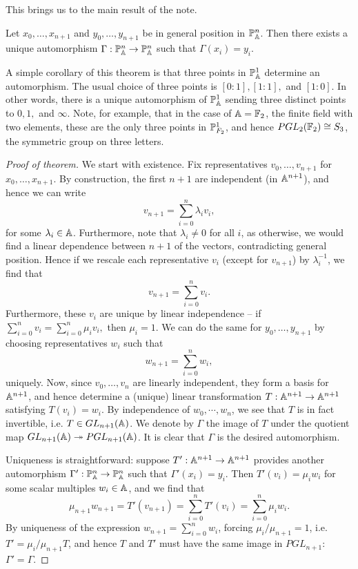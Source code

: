 \documentclass{../../mathnotes}
\begin{document}
This brings us to the main result of the note.

\begin{thm}
    Let $x_0,\ldots, x_{n+1}$ and $y_0,\ldots, y_{n+1}$ be in general position in $\mathbb{P}^n_{\mathbb{A}}$. Then there exists a unique
    automorphism $\Gamma:\mathbb{P}^n_{\mathbb{A}}\to\mathbb{P}^n_{\mathbb{A}}$ such that $\Gamma(x_i)=y_i$.
\end{thm}

\begin{rem}
    A simple corollary of this theorem is that three points in $\mathbb{P}^1_{\mathbb{A}}$ determine an automorphism. The usual choice of three points is $[0:1],[1:1],$ and $[1:0]$.
    In other words, there is a unique automorphism of $\mathbb{P}^1_{\mathbb{A}}$ sending three distinct points to $0,1,$ and $\infty$. Note, for example, that in the case of $\mathbb{A}=\mathbb{F}_2$,
    the finite field with two elements, these are the only three points in $\mathbb{P}^1_{F_2}$, and hence $PGL_{2}(\mathbb{F}_2)\cong S_3$, the symmetric group on three letters.
\end{rem}

\begin{proof}[Proof of theorem]
    We start with existence.
    Fix representatives $v_0,\ldots,v_{n+1}$ for $x_0,\ldots,x_{n+1}$. By construction, the first $n+1$ are independent (in $\mathbb{A}^{n+1}$),
    and hence we can write
    \[v_{n+1}=\sum_{i=0}^{n}\lambda_i v_i,\]
    for some $\lambda_i\in\mathbb{A}$. Furthermore, note that $\lambda_i\neq0$ for all $i$, as otherwise, we would find a linear dependence between
    $n+1$ of the vectors, contradicting general position. Hence if we rescale each representative $v_i$ (except for $v_{n+1}$) by $\lambda_i^{-1}$,
    we find that
    \[v_{n+1}=\sum_{i=0}^nv_i.\]
    Furthermore, these $v_i$ are unique by linear independence -- if $\sum_{i=0}^nv_i=\sum_{i=0}^n\mu_i v_i,$ then $\mu_i=1$.
    We can do the same for $y_0,\ldots,y_{n+1}$ by choosing representatives $w_i$ such that
    \[w_{n+1}=\sum_{i=0}^nw_i,\]
    uniquely.
    Now, since $v_0,\ldots, v_n$ are linearly independent, they form a basis for $\mathbb{A}^{n+1}$, and hence
    determine a (unique) linear transformation $T:\mathbb{A}^{n+1}\to\mathbb{A}^{n+1}$ satisfying $T(v_i)=w_i$. By independence
    of $w_0,\cdots, w_n$, we see that $T$ is in fact invertible, i.e. $T\in GL_{n+1}(\mathbb{A})$.
    We denote by $\Gamma$ the image of $T$ under the quotient map $GL_{n+1}(\mathbb{A})\twoheadrightarrow PGL_{n+1}(\mathbb{A})$.
    It is clear that $\Gamma$ is the desired automorphism.

    Uniqueness is straightforward: suppose $T':\mathbb{A}^{n+1}\to\mathbb{A}^{n+1}$ provides another automorphism $\Gamma':\mathbb{P}^n_{\mathbb{A}}\to\mathbb{P}^n_{\mathbb{A}}$
    such that $\Gamma'(x_i)=y_i$. Then $T'(v_i)=\mu_iw_i$ for some scalar multiples $w_i\in\mathbb{A}$, and we find that
    \[\mu_{n+1}w_{n+1}=T'(v_{n+1})=\sum_{i=0}^nT'(v_i)=\sum_{i=0}^n\mu_iw_i.\]
    By uniqueness of the expression $w_{n+1}=\sum_{i=0}^nw_i$, forcing $\mu_i/\mu_{n+1}=1$, i.e. $T'=\mu_i/\mu_{n+1}T$,
    and hence $T$ and $T'$ must have the same image in $PGL_{n+1}$: $\Gamma'=\Gamma$.
\end{proof}
\end{document}
